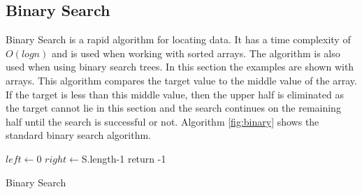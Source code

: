 \documentclass[10pt,twocolumn,hidelinks]{IEEEtran}
\begin{document}
\subsection{Binary Search}
Binary Search is a rapid algorithm for locating data. It has a time complexity of $O(log{n})$ and is used when working with sorted arrays. The algorithm is also used when using binary search trees. In this section the examples are shown with arrays. This algorithm compares the target value to the middle value of the array. If the target is less than this middle value, then the upper half is eliminated as the target cannot lie in this section and the search continues on the remaining half until the search is successful or not. Algorithm \ref{fig:binary} shows the standard binary search algorithm.
\IncMargin{1em}
\begin{algorithm}
\LinesNumbered
	\SetAlgoLined
	$left \longleftarrow $0\;
	$right \longleftarrow $S.length-1\;
	return -1\;
\caption{Binary Search}
\label{fig:binary}
\end{algorithm}\DecMargin{1em}
\end{document}
